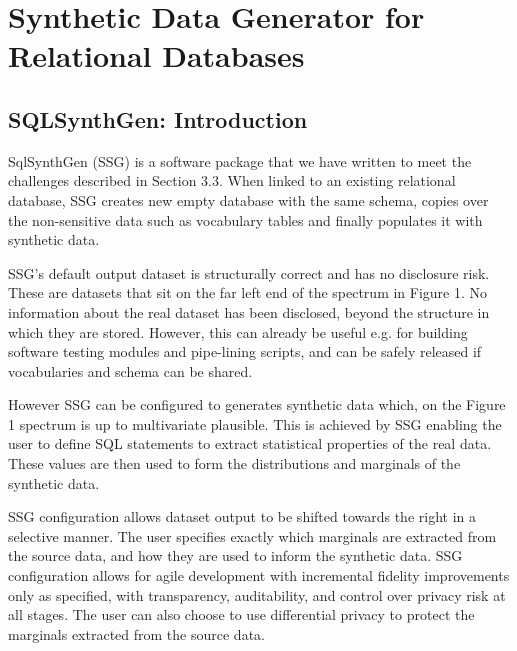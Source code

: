 \documentclass[11pt]{article}
\begin{document}
\section{Synthetic Data Generator for Relational Databases}

\subsection{SQLSynthGen: Introduction}

SqlSynthGen (SSG) is a software package that we have written to meet the challenges described in Section 3.3. When linked to an existing relational database, SSG creates new empty database with the same schema, copies over the non-sensitive data such as vocabulary tables and finally populates it with synthetic data. 

SSG's default output dataset is structurally correct and has no disclosure risk. These are datasets that sit on the far left end of the spectrum in Figure 1. No information about the real dataset has been disclosed, beyond the structure in which they are stored. However, this can already be useful e.g. for building software testing modules and pipe-lining scripts, and can be safely released if vocabularies and schema can be shared.

However SSG can be configured to generates synthetic data which, on the Figure 1 spectrum is up to multivariate plausible. This is achieved by SSG enabling the user to define SQL statements to extract statistical properties of the real data. These values are then used to form the distributions and marginals of the synthetic data. 

SSG configuration allows dataset output to be shifted towards the right in a selective manner. The user specifies exactly which marginals are extracted from the source data, and how they are used to inform the synthetic data. SSG configuration allows for agile development with incremental fidelity improvements only as specified, with transparency, auditability, and control over privacy risk at all stages. The user can also choose to use differential privacy to protect the marginals extracted from the source data.
\end{document}
